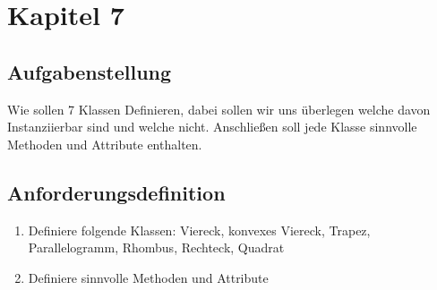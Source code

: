 \section{Kapitel 7}
\subsection{Aufgabenstellung}
Wie sollen 7 Klassen Definieren, dabei sollen wir uns überlegen welche davon Instanziierbar sind und welche
nicht. Anschließen soll jede Klasse sinnvolle Methoden und Attribute enthalten.

\subsection{Anforderungsdefinition}
\begin{enumerate}
	\item Definiere folgende Klassen: Viereck, konvexes Viereck, Trapez, Parallelogramm, Rhombus, Rechteck, Quadrat
	\item Definiere sinnvolle Methoden und Attribute
\end{enumerate}

